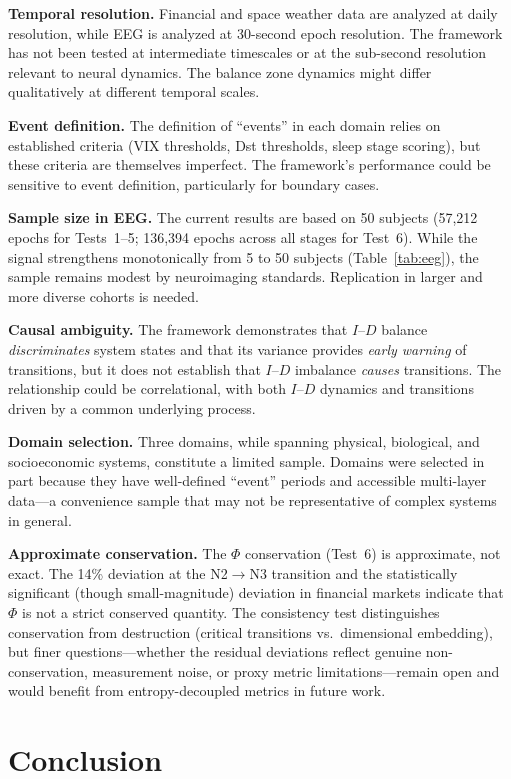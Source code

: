 \documentclass[aip,cha,reprint,amsmath,amssymb,final,floatfix]{revtex4-2}
\begin{document}
\textbf{Temporal resolution.} Financial and space weather data are analyzed at daily resolution, while EEG is analyzed at 30-second epoch resolution. The framework has not been tested at intermediate timescales or at the sub-second resolution relevant to neural dynamics. The balance zone dynamics might differ qualitatively at different temporal scales.

\textbf{Event definition.} The definition of ``events'' in each domain relies on established criteria (VIX thresholds, Dst thresholds, sleep stage scoring), but these criteria are themselves imperfect. The framework's performance could be sensitive to event definition, particularly for boundary cases.

\textbf{Sample size in EEG.} The current results are based on 50 subjects (57,212 epochs for Tests~1--5; 136,394 epochs across all stages for Test~6). While the signal strengthens monotonically from 5 to 50 subjects (Table~\ref{tab:eeg}), the sample remains modest by neuroimaging standards. Replication in larger and more diverse cohorts is needed.

\textbf{Causal ambiguity.} The framework demonstrates that $I$--$D$ balance \emph{discriminates} system states and that its variance provides \emph{early warning} of transitions, but it does not establish that $I$--$D$ imbalance \emph{causes} transitions. The relationship could be correlational, with both $I$--$D$ dynamics and transitions driven by a common underlying process.

\textbf{Domain selection.} Three domains, while spanning physical, biological, and socioeconomic systems, constitute a limited sample. Domains were selected in part because they have well-defined ``event'' periods and accessible multi-layer data---a convenience sample that may not be representative of complex systems in general.

\textbf{Approximate conservation.} The $\Phi$ conservation (Test~6) is approximate, not exact. The 14\% deviation at the N2$\to$N3 transition and the statistically significant (though small-magnitude) deviation in financial markets indicate that $\Phi$ is not a strict conserved quantity. The consistency test distinguishes conservation from destruction (critical transitions vs.\ dimensional embedding), but finer questions---whether the residual deviations reflect genuine non-conservation, measurement noise, or proxy metric limitations---remain open and would benefit from entropy-decoupled metrics in future work.


\section{Conclusion}
\end{document}
